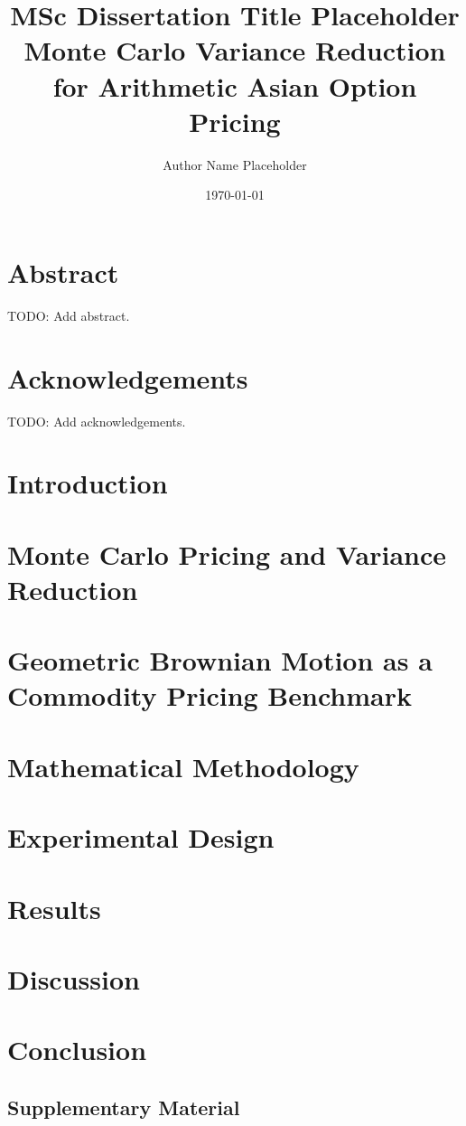 \documentclass[12pt,a4paper]{report}
\title{MSc Dissertation Title Placeholder\\\large Monte Carlo Variance Reduction for Arithmetic Asian Option Pricing}
\author{Author Name Placeholder}
\date{\today}
\begin{document}

\maketitle

\chapter*{Abstract}
TODO: Add abstract.

\chapter*{Acknowledgements}
TODO: Add acknowledgements.

\tableofcontents
\listoffigures
\listoftables

\clearpage
{}

\chapter{Introduction}


\chapter{Monte Carlo Pricing and Variance Reduction}


\chapter{Geometric Brownian Motion as a Commodity Pricing Benchmark}


\chapter{Mathematical Methodology}


\chapter{Experimental Design}


\chapter{Results}


\chapter{Discussion}


\chapter{Conclusion}


\begin{appendices}
\chapter{Supplementary Material}

\end{appendices}

\printbibliography
\end{document}
